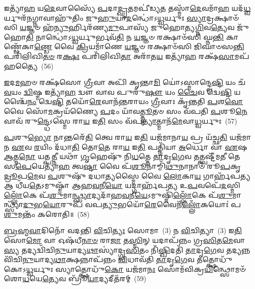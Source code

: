 𑌇𑌤𑍍𑌯𑌾᳴\-\ul{𑌹} 𑌯\-\ul{𑌦𑍇}\-𑌵𑌾𑌸𑍍𑌯𑍈᳴ \ul{𑌪}\-𑌦𑌾\-\ul{𑌦𑍍𑌘𑍃}\-𑌤𑌮𑌪𑍀॑𑌡𑍍𑌯\-\ul{𑌤} 𑌤𑌸𑍍𑌮𑌾᳴\-\ul{𑌦𑍇}\-𑌵𑌮𑌾᳴\-\ul{𑌹} 𑌯𑌦᳴\-\ul{𑌧𑍍𑌵}\-𑌰𑍍𑌯𑍁𑌰᳴\-\ul{𑌨}\-𑌗𑍍𑌨𑌾𑌵𑌾𑌹𑍁᳴𑌤𑌿𑌂 𑌜𑍁\-\ul{𑌹𑍁}\-𑌯𑌾\-\ul{𑌦}\-𑌨𑍍𑌧𑍋॑\-𑌽\-\ul{𑌧𑍍𑌵}\-𑌰𑍍𑌯𑍁𑌃 \ul{𑌸𑍍𑌯𑌾}\-𑌦𑍍𑌰𑌕𑍍𑌷𑌾𑍞᳴𑌸𑌿 \ul{𑌯}\-𑌜𑍍𑌞𑍞 𑌹᳴\-\ul{𑌨𑍍𑌯𑍁}\-𑌰𑍍\mbox{}𑌹𑌿𑌰᳴𑌣𑍍𑌯\-\ul{𑌮𑍁}\-𑌪𑌾𑌸𑍍𑌯᳴ 𑌜𑍁𑌹𑍋𑌤𑍍𑌯\-\ul{𑌗𑍍𑌨𑌿}\-𑌵\-\ul{𑌤𑍍𑌯𑍇}\-𑌵 𑌜𑍁᳴𑌹𑍋\-\ul{𑌤𑌿} 𑌨𑌾𑌨𑍍𑌧𑍋॑\-𑌽\-\ul{𑌧𑍍𑌵}\-𑌰𑍍𑌯𑍁𑌰𑍍𑌭𑌵᳴\-\ul{𑌤𑌿} 𑌨 \ul{𑌯}\-𑌜𑍍𑌞𑍞 𑌰𑌕𑍍𑌷𑌾𑍞᳴𑌸𑌿 𑌘𑍍𑌨\-\ul{𑌨𑍍𑌤𑌿} 𑌕𑌾𑌣𑍍𑌡𑍇᳴𑌕𑌾\-\ul{𑌣𑍍𑌡𑍇} 𑌵𑍈 \ul{𑌕𑍍𑌰𑌿}\-𑌯𑌮𑌾᳴𑌣𑍇 \ul{𑌯}\-𑌜𑍍𑌞𑍞 𑌰𑌕𑍍𑌷𑌾𑍞᳴𑌸𑌿 𑌜𑌿𑌘𑌾𑍞𑌸\-\ul{𑌨𑍍𑌤𑌿} 𑌪𑌰𑌿᳴𑌲𑌿𑌖𑌿\-\ul{𑌤}\-\-\ul{𑍞} 𑌰\-\ul{𑌕𑍍𑌷𑌃} 𑌪𑌰𑌿᳴𑌲𑌿𑌖𑌿\-\ul{𑌤𑌾} 𑌅𑌰𑌾᳴𑌤\-\ul{𑌯} 𑌇𑌤𑍍𑌯𑌾᳴\-\ul{𑌹} 𑌰𑌕𑍍𑌷᳴\-\ul{𑌸𑌾}\-𑌮𑌪᳴𑌹𑌤𑍍𑌯𑍈~(56)

\-\ul{𑌇}\-𑌦\-\ul{𑌮}\-𑌹𑍞 𑌰𑌕𑍍𑌷᳴𑌸𑍋 \ul{𑌗𑍍𑌰𑍀}\-𑌵𑌾 𑌅𑌪𑌿᳴ 𑌕𑍃𑌨𑍍𑌤𑌾\-\ul{𑌮𑌿} 𑌯𑍋॑\-𑌽𑌸𑍍𑌮𑌾𑌨𑍍𑌦𑍍𑌵𑍇\-\ul{𑌷𑍍𑌟𑌿} 𑌯𑌂 𑌚᳴ \ul{𑌵}\-𑌯𑌂 \ul{𑌦𑍍𑌵𑌿}\-𑌷𑍍𑌮 𑌇𑌤𑍍𑌯𑌾᳴\-\ul{𑌹} 𑌦𑍍𑌵𑍗 𑌵𑌾𑌵 𑌪𑍁𑌰𑍁᳴\-\ul{𑌷𑍗} 𑌯𑌂 \ul{𑌚𑍈}\-𑌵 𑌦𑍍𑌵𑍇\-\ul{𑌷𑍍𑌟𑌿} 𑌯𑌶𑍍𑌚𑍈᳴\-\ul{𑌨𑌂} 𑌦𑍍𑌵𑍇\-\ul{𑌷𑍍𑌟𑌿} 𑌤𑌯𑍋᳴\-\ul{𑌰𑍇}\-𑌵𑌾𑌨᳴𑌨𑍍𑌤𑌰𑌾𑌯𑌂 \ul{𑌗𑍍𑌰𑍀}\-𑌵𑌾𑌃 𑌕𑍃᳴𑌨𑍍𑌤𑌤𑌿 \ul{𑌪}\-𑌶\-\ul{𑌵𑍋} 𑌵𑍈 𑌸𑍋᳴\-\ul{𑌮}\-𑌕𑍍𑌰𑌯᳴𑌣𑍍𑌯𑍈 \ul{𑌪}\-𑌦𑌂 𑌯𑌾᳴𑌵\-\ul{𑌤𑍍𑌤𑍍𑌮𑍂}\-𑌤𑍞 𑌸𑌂 𑌵᳴𑌪𑌤𑌿 \ul{𑌪}\-𑌶𑍂\-\ul{𑌨𑍇}\-𑌵𑌾𑌵᳴ 𑌰𑍁\-\ul{𑌨𑍍𑌦𑍍𑌧𑍇}\-\-𑌽𑌸𑍍𑌮𑍇 𑌰𑌾\-\ul{𑌯} 𑌇\-\ul{𑌤𑌿} 𑌸𑌂 𑌵᳴𑌪\-\ul{𑌤𑍍𑌯𑌾}\-𑌤𑍍𑌮𑌾𑌨᳴\-\ul{𑌮𑍇}\-𑌵𑌾\-\ul{𑌧𑍍𑌵}\-𑌰𑍍𑌯𑍁𑌃~(57)

\-\ul{𑌪}\-𑌶𑍁\-\ul{𑌭𑍍𑌯𑍋} 𑌨𑌾𑌨𑍍𑌤𑌰𑍇᳴\-\ul{𑌤𑌿} 𑌤𑍍𑌵𑍇 𑌰𑌾\-\ul{𑌯} 𑌇\-\ul{𑌤𑌿} 𑌯𑌜᳴𑌮𑌾𑌨𑌾\-\ul{𑌯} 𑌪𑍍𑌰 𑌯᳴𑌚𑍍𑌛\-\ul{𑌤𑌿} 𑌯𑌜᳴𑌮𑌾𑌨 \ul{𑌏}\-𑌵 \ul{𑌰}\-𑌯𑌿𑌂 𑌦᳴𑌧𑌾\-\ul{𑌤𑌿} 𑌤𑍋\-\ul{𑌤𑍇} 𑌰𑌾\-\ul{𑌯} 𑌇\-\ul{𑌤𑌿} 𑌪𑌤𑍍𑌨𑌿᳴𑌯𑌾 \ul{𑌅}\-𑌰𑍍𑌧𑍋 𑌵𑌾 \ul{𑌏}\-𑌷 \ul{𑌆}\-𑌤𑍍𑌮\-\ul{𑌨𑍋} 𑌯𑌤𑍍𑌪\-\ul{𑌤𑍍𑌨𑍀} 𑌯𑌥𑌾᳴ \ul{𑌗𑍃}\-𑌹𑍇𑌷𑍁᳴ 𑌨𑌿\-\ul{𑌧}\-𑌤𑍍𑌤𑍇 \ul{𑌤𑌾}\-𑌦𑍃\-\ul{𑌗𑍇}\-𑌵 𑌤𑌤𑍍𑌤𑍍𑌵𑌷𑍍𑌟𑍀᳴𑌮𑌤𑍀 𑌤𑍇 𑌸\-\ul{𑌪𑍇}\-𑌯𑍇𑌤𑍍𑌯𑌾᳴\-\ul{𑌹} 𑌤𑍍𑌵\-\ul{𑌷𑍍𑌟𑌾} 𑌵𑍈 𑌪᳴\-\ul{𑌶𑍂}\-𑌨𑌾𑌮𑍍𑌮𑌿᳴\-\ul{𑌥𑍁}\-𑌨𑌾𑌨𑌾𑍞᳴ 𑌰𑍂\-\ul{𑌪}\-𑌕𑍃\-\ul{𑌦𑍍𑌰𑍂}\-𑌪\-\ul{𑌮𑍇}\-𑌵 \ul{𑌪}\-𑌶𑍁𑌷𑍁᳴ 𑌦𑌧𑌾\-\ul{𑌤𑍍𑌯}\-𑌸𑍍𑌮𑍈 𑌵𑍈 \ul{𑌲𑍋}\-𑌕𑌾\-\ul{𑌯} 𑌗𑌾𑌰𑍍\mbox{}𑌹᳴𑌪\-\ul{𑌤𑍍𑌯} 𑌆 𑌧𑍀᳴𑌯\-\ul{𑌤𑍇}\-\-𑌽𑌮𑍁𑌷𑍍𑌮𑌾᳴ 𑌆𑌹\-\ul{𑌵}\-𑌨𑍀\-\ul{𑌯𑍋} 𑌯𑌦𑍍𑌗𑌾𑌰𑍍\mbox{}𑌹᳴𑌪𑌤𑍍𑌯 𑌉\-\ul{𑌪}\-𑌵𑌪𑍇᳴\-\ul{𑌦}\-𑌸𑍍𑌮𑌿\-\ul{𑌲𑍍𑌲𑍋𑌁}\-𑌕𑍇 𑌪᳴\-\ul{𑌶𑍁}\-𑌮𑌾\-\ul{𑌨𑍍𑌥𑍍𑌸𑍍𑌯𑌾}\-𑌦𑍍𑌯𑌦𑌾᳴𑌹\-\ul{𑌵}\-𑌨𑍀\-\ul{𑌯𑍇}\-\-𑌽𑌮𑍁𑌷𑍍𑌮𑌿᳴\-\ul{𑌲𑍍𑌲𑍋𑌁}\-𑌕𑍇 𑌪᳴\-\ul{𑌶𑍁}\-𑌮𑌾𑌨𑍍𑌥𑍍𑌸𑍍𑌯𑌾᳴\-\ul{𑌦𑍁}\-𑌭\-\ul{𑌯𑍋}\-𑌰𑍁𑌪᳴ 𑌵𑌪\-\ul{𑌤𑍍𑌯𑍁}\-𑌭𑌯𑍋᳴\-\ul{𑌰𑍇}\-𑌵𑍈𑌨᳴\-\ul{𑌲𑍍𑌲𑍋𑌁}\-𑌕𑌯𑍋𑌃॑ 𑌪\-\ul{𑌶𑍁}\-𑌮𑌨𑍍𑌤𑌂᳴ 𑌕𑌰𑍋𑌤𑌿॥~(58)

{\anuvakamend[{\-\ul{𑌮}\-\-\ul{𑌹𑌿}\-𑌮𑌾\-\ul{𑌨}\-\-\ul{𑍟} 𑌸𑍍𑌵𑌾𑌹𑌾𑌪᳴𑌹𑌤𑍍𑌯𑌾 𑌅\-\ul{𑌧𑍍𑌵}\-𑌰𑍍𑌯𑍁𑌰𑍍𑌧𑍀᳴𑌯\-\ul{𑌤𑍇} 𑌚𑌤𑍁᳴𑌰𑍍𑌵𑌿H𑍞𑌶𑌤𑌿𑌶𑍍𑌚}]}%

\-\ul{𑌬𑍍𑌰}\-\-\ul{𑌹𑍍𑌮}\-\-\ul{𑌵𑌾}\-𑌦𑌿𑌨𑍋᳴ 𑌵𑌦𑌨𑍍𑌤𑌿 \ul{𑌵𑌿}\-𑌚𑌿\-\ul{𑌤𑍍𑌯𑌃} 𑌸𑍋𑌮𑌾~(3) 𑌨 \ul{𑌵𑌿}\-𑌚𑌿𑌤𑍍𑌯𑌾~(3) 𑌇\-\ul{𑌤𑌿} 𑌸𑍋\-\ul{𑌮𑍋} 𑌵𑌾 𑌓𑌷᳴𑌧𑍀\-\ul{𑌨𑌾}\-\-\ul{𑍞} 𑌰𑌾\-\ul{𑌜𑌾} 𑌤\-\ul{𑌸𑍍𑌮𑌿}\-𑌨𑍍 𑌯𑌦𑌾𑌪᳴𑌨𑍍𑌨𑌂 𑌗𑍍𑌰\-\ul{𑌸𑌿}\-𑌤\-\ul{𑌮𑍇}\-𑌵𑌾\-\ul{𑌸𑍍𑌯} 𑌤𑌦𑍍𑌯𑌦𑍍𑌵𑌿᳴𑌚𑌿\-\ul{𑌨𑍁}\-𑌯𑌾𑌦𑍍𑌯\-\ul{𑌥𑌾}\-𑌸𑍍𑌯𑌾॑𑌦𑍍𑌗𑍍𑌰\-\ul{𑌸𑌿}\-𑌤𑌂 𑌨𑌿᳴\-\ul{𑌷𑍍𑌖𑌿}\-𑌦𑌤𑌿᳴ \ul{𑌤𑌾}\-𑌦𑍃\-\ul{𑌗𑍇}\-𑌵 𑌤𑌦𑍍𑌯𑌨𑍍𑌨 𑌵𑌿᳴𑌚𑌿\-\ul{𑌨𑍁}\-𑌯𑌾𑌦𑍍𑌯\-\ul{𑌥𑌾}\-𑌕𑍍𑌷𑌨𑍍𑌨𑌾𑌪᳴𑌨𑍍𑌨𑌂 \ul{𑌵𑌿}\-𑌧𑌾𑌵᳴𑌤𑌿 \ul{𑌤𑌾}\-𑌦𑍃\-\ul{𑌗𑍇}\-𑌵 𑌤𑌤𑍍𑌕𑍍𑌷𑍋𑌧𑍁᳴𑌕𑍋\-𑌽\-\ul{𑌧𑍍𑌵}\-𑌰𑍍𑌯𑍁𑌃 𑌸𑍍𑌯𑌾𑌤𑍍𑌕𑍍𑌷𑍋𑌧𑍁᳴\-\ul{𑌕𑍋} 𑌯𑌜᳴𑌮𑌾\-\ul{𑌨𑌃} 𑌸𑍋𑌮᳴𑌵𑌿𑌕𑍍𑌰\-\ul{𑌯𑌿}\-𑌨𑍍𑌥𑍍𑌸𑍋𑌮𑍞᳴ 𑌶𑍋\-\ul{𑌧}\-𑌯𑍇\-\ul{𑌤𑍍𑌯𑍇}\-𑌵 𑌬𑍍𑌰𑍂᳴\-\ul{𑌯𑌾}\-𑌦𑍍𑌯𑌦𑍀𑌤᳴𑌰𑌮𑍍~(59)


